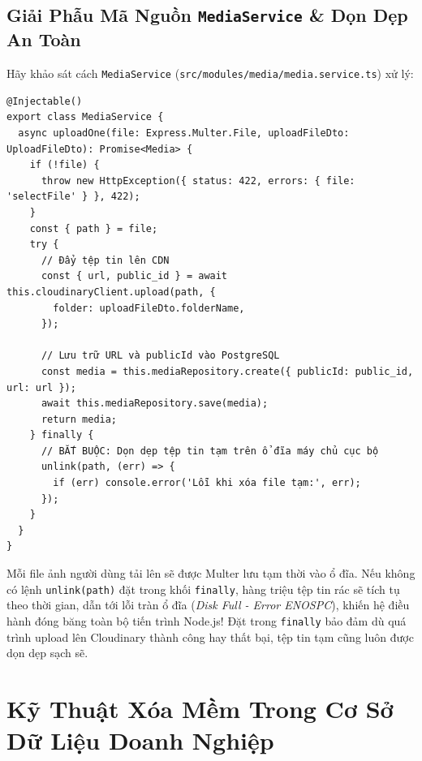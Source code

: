 \documentclass[12pt,a4paper,oneside]{book}
\begin{document}
\section{Giải Phẫu Mã Nguồn \texttt{MediaService} \& Dọn Dẹp An Toàn}
Hãy khảo sát cách \texttt{MediaService} (\texttt{src/modules/media/media.service.ts}) xử lý:

\begin{codebox}
\begin{Verbatim}[fontsize=\small]
@Injectable()
export class MediaService {
  async uploadOne(file: Express.Multer.File, uploadFileDto: UploadFileDto): Promise<Media> {
    if (!file) {
      throw new HttpException({ status: 422, errors: { file: 'selectFile' } }, 422);
    }
    const { path } = file;
    try {
      // Đẩy tệp tin lên CDN
      const { url, public_id } = await this.cloudinaryClient.upload(path, {
        folder: uploadFileDto.folderName,
      });

      // Lưu trữ URL và publicId vào PostgreSQL
      const media = this.mediaRepository.create({ publicId: public_id, url: url });
      await this.mediaRepository.save(media);
      return media;
    } finally {
      // BẮT BUỘC: Dọn dẹp tệp tin tạm trên ổ đĩa máy chủ cục bộ
      unlink(path, (err) => {
        if (err) console.error('Lỗi khi xóa file tạm:', err);
      });
    }
  }
}
\end{Verbatim}
\end{codebox}

\begin{warningbox}
  Mỗi file ảnh người dùng tải lên sẽ được Multer lưu tạm thời vào ổ đĩa. Nếu không có lệnh \texttt{unlink(path)} đặt trong khối \texttt{finally}, hàng triệu tệp tin rác sẽ tích tụ theo thời gian, dẫn tới lỗi tràn ổ đĩa (\textit{Disk Full - Error ENOSPC}), khiến hệ điều hành đóng băng toàn bộ tiến trình Node.js! Đặt trong \texttt{finally} bảo đảm dù quá trình upload lên Cloudinary thành công hay thất bại, tệp tin tạm cũng luôn được dọn dẹp sạch sẽ.
\end{warningbox}

\chapter{Kỹ Thuật Xóa Mềm Trong Cơ Sở Dữ Liệu Doanh Nghiệp}
\end{document}
